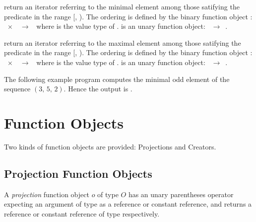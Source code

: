 {return an iterator referring to the minimal element among those satifying the
  predicate  in the range [, ). The ordering is
  defined by the binary function object :
  ~$\times$~~$\rightarrow$~ where  is the value type
  of .  is an unary function object:
  ~$\rightarrow$~.}

{return an iterator referring to the maximal element among those satifying the
  predicate  in the range [, ). The ordering is
  defined by the binary function object :
  ~$\times$~~$\rightarrow$~ where  is the value type
  of .  is an unary function object:
  ~$\rightarrow$~.}

\ccExample The following example program computes the minimal odd element of
the sequence $(3,\,5,\,2)$. Hence the output is .


  \def\ccLongParamLayout{\ccTrue}

\newpage
\section{Function Objects}

Two kinds of function objects are provided: Projections and Creators.

\subsection{Projection Function Objects}
\label{sectionProjectionFunctionObjects}

\ccDefinition 

A {\em projection\/} function object $o$ of type $O$ has an unary parentheses
operator expecting an argument of type  as a
reference or constant reference, and returns a reference or constant
reference of type  respectively.

